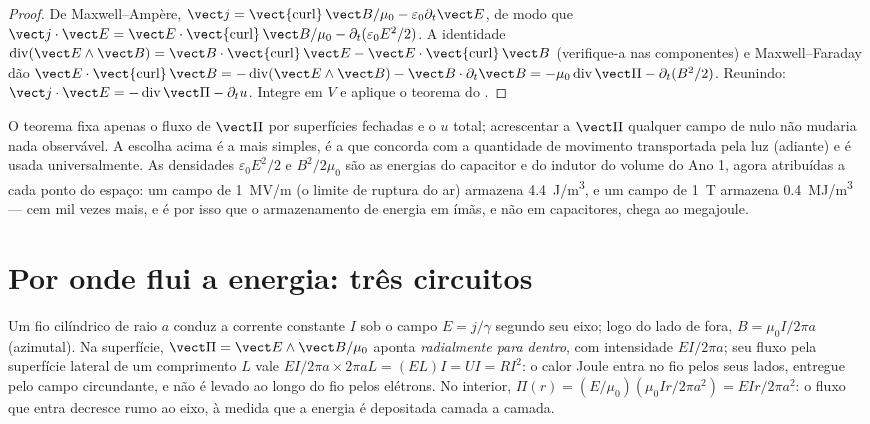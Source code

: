 \begin{proof}
De Maxwell--Ampère, $\vect j = \operatorname{\vect{curl}}\vect B/\mu_0 - \varepsilon_0\partial_t
\vect E$, de modo que $\vect j\cdot\vect E = \vect E\cdot\operatorname{\vect{curl}}\vect B/\mu_0 -
\partial_t(\varepsilon_0E^2/2)$. A identidade $\operatorname{div}(\vect E\wedge\vect B) = \vect B
\cdot\operatorname{\vect{curl}}\vect E - \vect E\cdot\operatorname{\vect{curl}}\vect B$ (verifique-a
nas componentes) e Maxwell--Faraday dão $\vect E\cdot\operatorname{\vect{curl}}
\vect B = -\operatorname{div}(\vect E\wedge\vect B) - \vect B\cdot\partial_t\vect B = -\mu_0
\operatorname{div}\vect\Pi - \partial_t(B^2/2)$. Reunindo: $\vect j\cdot\vect E = -\operatorname{div}
\vect\Pi - \partial_tu$. Integre em $V$ e aplique o teorema do .
\end{proof}

\begin{remark}\label{rem:b2:poynting-vector:interpretation}
O teorema fixa apenas o fluxo de $\vect\Pi$ por superfícies fechadas
e o $u$ total; acrescentar a $\vect\Pi$ qualquer campo de  nulo não
mudaria nada observável. A escolha acima é a mais simples, é a
que concorda com a quantidade de movimento transportada pela luz (adiante) e é
usada universalmente. As densidades $\varepsilon_0E^2/2$ e $B^2/2\mu_0$ são as
energias do capacitor e do indutor do volume do Ano 1,
agora atribuídas a cada ponto do espaço: um campo de \qty{1}{MV/m} (o
limite de ruptura do ar) armazena \qty{4.4}{J/m^3}, e um campo de \qty{1}{T}
armazena \qty{0.4}{MJ/m^3} --- cem mil vezes mais, e é por isso que o
armazenamento de energia em ímãs, e não em capacitores, chega ao megajoule.
\end{remark}

\section{Por onde flui a energia: três circuitos}

\begin{example}\label{ex:b2:poynting-vector:wire}
Um fio cilíndrico de raio $a$ conduz a corrente constante $I$ sob o
campo $E = j/\gamma$ segundo seu eixo; logo do lado de fora, $B = \mu_0I/2\pi a$
(azimutal). Na superfície, $\vect\Pi = \vect E\wedge\vect B/\mu_0$ aponta
\emph{radialmente para dentro}, com intensidade $EI/2\pi a$; seu fluxo pela
superfície lateral de um comprimento $L$ vale $EI/2\pi a\times2\pi aL = (EL)I = UI =
RI^2$: o calor Joule entra no fio pelos seus lados, entregue pelo
campo circundante, e não é levado ao longo do fio pelos elétrons.
No interior, $\Pi(r) = (E/\mu_0)(\mu_0Ir/2\pi a^2) = EIr/2\pi a^2$: o fluxo que entra
decresce rumo ao eixo, à medida que a energia é depositada camada a camada.
\end{example}

